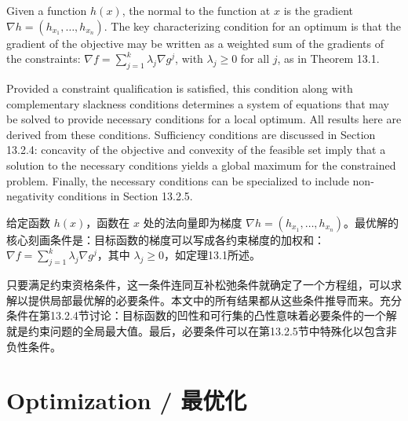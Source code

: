 \begin{original}
Given a function $h(x)$, the normal to the function at $x$ is the gradient $\nabla h = (h_{x_1}, \dots, h_{x_n})$. The key characterizing condition for an optimum is that the gradient of the objective may be written as a weighted sum of the gradients of the constraints: $\nabla f = \sum_{j=1}^k \lambda_j \nabla g^j$, with $\lambda_j \ge 0$ for all $j$, as in Theorem 13.1.

Provided a constraint qualification is satisfied, this condition along with complementary slackness conditions determines a system of equations that may be solved to provide necessary conditions for a local optimum. All results here are derived from these conditions. Sufficiency conditions are discussed in Section 13.2.4: concavity of the objective and convexity of the feasible set imply that a solution to the necessary conditions yields a global maximum for the constrained problem. Finally, the necessary conditions can be specialized to include non-negativity conditions in Section 13.2.5.
\end{original}
\begin{translation}
给定函数 $h(x)$，函数在 $x$ 处的法向量即为梯度 $\nabla h = (h_{x_1}, \dots, h_{x_n})$。最优解的核心刻画条件是：目标函数的梯度可以写成各约束梯度的加权和：$\nabla f = \sum_{j=1}^k \lambda_j \nabla g^j$，其中 $\lambda_j \ge 0$，如定理13.1所述。

只要满足约束资格条件，这一条件连同互补松弛条件就确定了一个方程组，可以求解以提供局部最优解的必要条件。本文中的所有结果都从这些条件推导而来。充分条件在第13.2.4节讨论：目标函数的凹性和可行集的凸性意味着必要条件的一个解就是约束问题的全局最大值。最后，必要条件可以在第13.2.5节中特殊化以包含非负性条件。
\end{translation}

\section{Optimization / 最优化}

